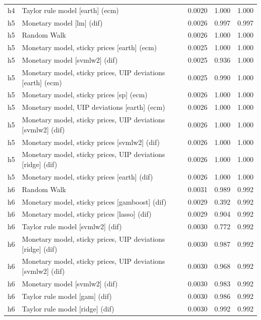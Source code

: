 \begin{ThreePartTable}
\begin{longtable}[t]{cp{5.5cm}ccc}
h4 & \raggedright Taylor rule model [earth] (ecm) & 0.0020 & 1.000 & 1.000\\
\addlinespace
h5 & \raggedright Monetary model [lm] (dif) & 0.0026 & 0.997 & 0.997\\
h5 & \raggedright Random Walk & 0.0026 & 1.000 & 1.000\\
h5 & \raggedright Monetary model, sticky prices [earth] (ecm) & 0.0025 & 1.000 & 1.000\\
h5 & \raggedright Monetary model [svmlw2] (dif) & 0.0025 & 0.936 & 1.000\\
h5 & \raggedright Monetary model, sticky prices, UIP deviations [earth] (ecm) & 0.0025 & 0.990 & 1.000\\
h5 & \raggedright Monetary model, sticky prices [sp] (ecm) & 0.0026 & 1.000 & 1.000\\
h5 & \raggedright Monetary model, UIP deviations [earth] (ecm) & 0.0026 & 1.000 & 1.000\\
h5 & \raggedright Monetary model, sticky prices, UIP deviations [svmlw2] (dif) & 0.0026 & 1.000 & 1.000\\
h5 & \raggedright Monetary model, sticky prices [svmlw2] (dif) & 0.0026 & 1.000 & 1.000\\
h5 & \raggedright Monetary model, sticky prices, UIP deviations [ridge] (dif) & 0.0026 & 1.000 & 1.000\\
h5 & \raggedright Monetary model, sticky prices [earth] (dif) & 0.0026 & 1.000 & 1.000\\
\addlinespace
h6 & \raggedright Random Walk & 0.0031 & 0.989 & 0.992\\
h6 & \raggedright Monetary model, sticky prices [gamboost] (dif) & 0.0029 & 0.392 & 0.992\\
h6 & \raggedright Monetary model, sticky prices [lasso] (dif) & 0.0029 & 0.904 & 0.992\\
h6 & \raggedright Taylor rule model [svmlw2] (dif) & 0.0030 & 0.772 & 0.992\\
h6 & \raggedright Monetary model, sticky prices, UIP deviations [ridge] (dif) & 0.0030 & 0.987 & 0.992\\
h6 & \raggedright Monetary model, sticky prices, UIP deviations [svmlw2] (dif) & 0.0030 & 0.968 & 0.992\\
h6 & \raggedright Monetary model [svmlw2] (dif) & 0.0030 & 0.983 & 0.992\\
h6 & \raggedright Taylor rule model [gam] (dif) & 0.0030 & 0.986 & 0.992\\
h6 & \raggedright Taylor rule model [ridge] (dif) & 0.0030 & 0.992 & 0.992\\

\end{longtable}
\end{ThreePartTable}
